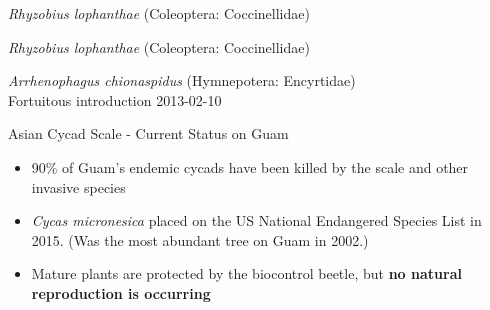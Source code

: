 \documentclass[]{beamer}
\begin{document}
\begin{frame}{\textit{Rhyzobius lophanthae} (Coleoptera: Coccinellidae)}
\end{frame}

\begin{frame}{\textit{Rhyzobius lophanthae} (Coleoptera: Coccinellidae)}
\end{frame}

\begin{frame}{\textit{Arrhenophagus chionaspidus} (Hymnepotera: Encyrtidae)\\Fortuitous introduction 2013-02-10}
	\begin{center}	
	\end{center}
\end{frame}


\begin{frame}{Asian Cycad Scale - Current Status on Guam}
	\begin{itemize}
		\item 90\% of Guam's endemic cycads have been killed by the scale and other invasive species
		
		\item \textit{Cycas micronesica} placed on the US National Endangered Species List in 2015. (Was the most abundant tree on Guam in 2002.)
				
		\item Mature plants are protected by the biocontrol beetle, but \textbf{no natural reproduction is occurring}
	\end{itemize}
\end{frame}


\end{document}
